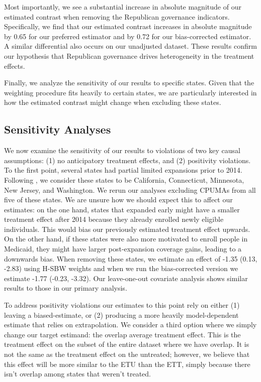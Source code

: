 \documentclass[12pt]{article}
\begin{document}
Most importantly, we see a substantial increase in absolute magnitude of our estimated contrast when removing the Republican governance indicators. Specifically, we find that our estimated contrast increases in absolute magnitude by 0.65 for our preferred estimator and by 0.72 for our bias-corrected estimator. A similar differential also occurs on our unadjusted dataset. These results confirm our hypothesis that Republican governance drives heterogeneity in the treatment effects.

Finally, we analyze the sensitivity of our results to specific states. Given that the weighting procedure fits heavily to certain states, we are particularly interested in how the estimated contrast might change when excluding these states.

\subsection{Sensitivity Analyses}

We now examine the sensitivity of our results to violations of two key causal assumptions: (1) no anticipatory treatment effects, and (2) positivity violations. To the first point, several states had partial limited expansions prior to 2014. Following \cite{frean2017premium}, we consider these states to be California, Connecticut, Minnesota, New Jersey, and Washington. We rerun our analyses excluding CPUMAs from all five of these states. We are unsure how we should expect this to affect our estimates: on the one hand, states that expanded early might have a smaller treatment effect after 2014 because they already enrolled newly eligible individuals. This would bias our previously estimated treatment effect upwards. On the other hand, if these states were also more motivated to enroll people in Medicaid, they might have larger post-expansion coverage gains, leading to a downwards bias. When removing these states, we estimate an effect of -1.35 (0.13, -2.83) using H-SBW weights and when we run the bias-corrected version we estimate -1.77 (-0.23, -3.32). Our leave-one-out covariate analysis shows similar results to those in our primary analysis.

To address positivity violations our estimates to this point rely on either (1) leaving a biased-estimate, or (2) producing a more heavily model-dependent estimate that relies on extrapolation. We consider a third option where we simply change our target estimand: the overlap average treatment effect. This is the treatment effect on the subset of the entire dataset where we have overlap. It is not the same as the treatment effect on the untreated; however, we believe that this effect will be more similar to the ETU than the ETT, simply because there isn't overlap among states that weren't treated.
\end{document}
